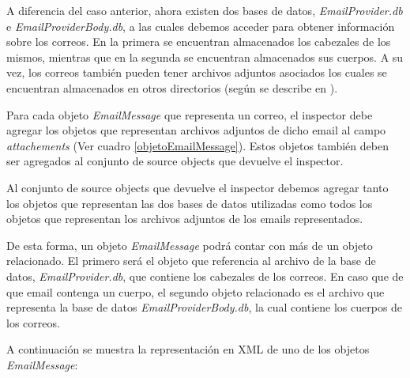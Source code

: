 A diferencia del caso anterior, ahora existen dos bases de datos, \emph{EmailProvider.db} e \emph{EmailProviderBody.db}, a las cuales debemos acceder para obtener información sobre los correos. En la primera se encuentran almacenados los cabezales de los mismos, mientras que en la segunda se encuentran almacenados sus cuerpos. A su vez, los correos también pueden tener archivos adjuntos asociados los cuales se encuentran almacenados en otros directorios (según se describe en \cite{attchprov}). 

Para cada objeto \emph{EmailMessage} que representa un correo, el inspector debe agregar los objetos que representan archivos adjuntos de dicho email al campo \emph{attachements} (Ver cuadro \ref{objetoEmailMessage}). Estos objetos también deben ser agregados al conjunto de source objects que devuelve el inspector.

Al conjunto de source objects que devuelve el inspector debemos agregar tanto los objetos que representan las dos bases de datos utilizadas como todos los objetos que representan los archivos adjuntos de los emails representados.

De esta forma, un objeto \emph{EmailMessage} podrá contar con más de un objeto relacionado. El primero será el objeto que referencia al archivo de la base de datos, \emph{EmailProvider.db}, que contiene los cabezales de los correos. En caso que de que email contenga un cuerpo, el segundo objeto relacionado es el archivo que representa la base de datos \emph{EmailProviderBody.db}, la cual contiene los cuerpos de los correos.

A continuación se muestra la representación en XML de uno de los objetos \emph{EmailMessage}:
\newline

